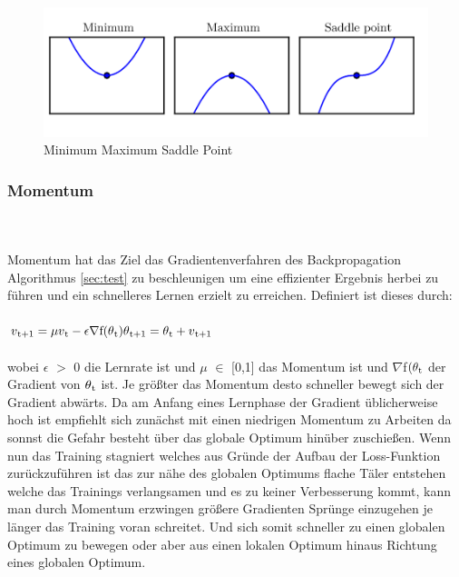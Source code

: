 \documentclass{llncs}
\begin{document}
\begin{figure}[htbp] 
	\centering
	\includegraphics[width=1.0\textwidth]{saddle.png}
	\caption{Minimum Maximum Saddle Point}
	\label{fig:Bild5}
\end{figure}


\subsubsection{Momentum}\label{sec:momentum}
~\\\\
Momentum hat das Ziel das Gradientenverfahren des Backpropagation Algorithmus \ref{sec:test} zu beschleunigen um eine effizienter Ergebnis herbei zu führen und ein schnelleres Lernen erzielt zu erreichen. Definiert ist dieses durch:
\\\\
\begin{math}
v\textsubscript{t+1} =\mu v\textsubscript{t}-\epsilon\nabla$f$(\theta\textsubscript{t})
\theta\textsubscript{t+1}= \theta\textsubscript{t}+v\textsubscript{t+1}
\end{math}
\\\\
wobei $\epsilon$ $>$ 0 die Lernrate ist und $\mu$ $\in$ [0,1] das Momentum ist und $\nabla$f$(\theta\textsubscript{t}$ der Gradient von $\theta\textsubscript{t}$ ist. Je größter das Momentum desto schneller bewegt sich der Gradient abwärts. Da am Anfang eines Lernphase der Gradient üblicherweise hoch ist empfiehlt sich zunächst mit einen niedrigen Momentum zu Arbeiten da sonnst die Gefahr besteht über das globale Optimum hinüber zuschießen. Wenn nun das Training stagniert welches aus Gründe der Aufbau der Loss-Funktion zurückzuführen ist das zur nähe des globalen Optimums flache Täler entstehen welche das Trainings verlangsamen und es zu keiner Verbesserung kommt, kann man durch Momentum erzwingen größere Gradienten Sprünge einzugehen  je länger das Training voran schreitet. Und sich somit schneller zu einen globalen Optimum zu bewegen oder aber aus einen lokalen Optimum hinaus Richtung eines globalen Optimum\cite{momentum}.
\end{document}
